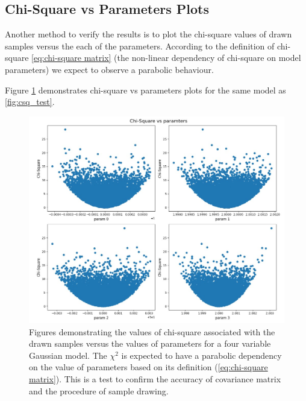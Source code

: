 \documentclass[12pt, TexShade, letterpaper]{report}
\begin{document}
\subsection{Chi-Square vs Parameters Plots}
\label{chap:method,sub:test,subsub:plot}
Another method to verify the results is to plot the chi-square values of drawn samples versus the each of the parameters. According to the definition of chi-square \ref{eq:chi-square matrix} (the non-linear dependency of chi-square on model parameters) we expect to observe a parabolic behaviour.\par
Figure \ref{fig:csq_params} demonstrates chi-square vs parameters plots for the same model as \ref{fig:csq_test}.
\begin{figure}[h!]
\centering
\includegraphics[scale =0.9]{csq_params.jpg}
\caption[Chi-Square vs parameters plots]{Figures demonstrating the values of chi-square associated with the drawn samples versus the values of parameters for a four variable Gaussian model. The $\chi^2$ is expected to have a parabolic dependency on the value of parameters based on its definition (\ref{eq:chi-square matrix}). This is a test to confirm the accuracy of covariance matrix and the procedure of sample drawing.}
\label{fig:csq_params}
\end{figure}
\end{document}
